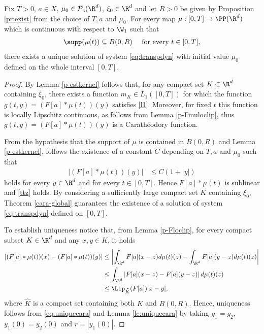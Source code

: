\begin{proposition}
Fix $T > 0$, $a \in X$, $\mu_0 \in \mathcal{P}_c(\R^d)$, $\xi_0 \in \R^d$ and let $R > 0$ be given by Proposition \ref{pr:exist} from the choice of $T, a$ and $\mu_0$. For every map $\mu:[0,T] \rightarrow \PP(\R^d)$ which is continuous with respect to $\W_1$ such that
\begin{align*}
\supp(\mu(t)) \subseteq B(0,R) \quad \text{ for every } t \in [0,T],
\end{align*}
there exists a unique solution of system \eqref{eq:transpdyn} with initial value $\mu_0$ defined on the whole interval $[0,T]$.
\end{proposition}
\begin{proof}
By Lemma \ref{p-estkernel} follows that, for any compact set $K \subset \R^d$ containing $\xi_0$, there exists a function $m_K \in L_1([0,T])$ for which the function $g(t,y)=(F[a]\ast\mu(t))(y)$ satisfies \eqref{l1}. Moreover, for fixed $t$ this function is locally Lipschitz continuous, as follows from Lemma \ref{p-Fmuloclip}, thus $g(t,y)=(F[a]\ast\mu(t))(y)$ is a Carath\'eodory function.

		
From the hypothesis that the support of $\mu$ is contained in $B(0,R)$ and Lemma \ref{p-estkernel}, follows the existence of a constant $C$ depending on $T,a$ and $\mu_0$ such that
\begin{align*}
|(F[a]*\mu(t))(y)| &\leq C(1+|y|)
\end{align*}
holds for every $y \in \R^d$ and for every $t \in [0,T]$. Hence $F[a]*\mu(t)$ is sublinear and \eqref{ttz} holds. By considering a sufficiently large compact set $K$ containing $\xi_0$, Theorem \ref{cara-global} guarantees the existence of a solution of system \eqref{eq:transpdyn} defined on $[0,T]$.

To establish uniqueness notice that, from Lemma \ref{p-Floclip}, for every compact subset $K \in \R^d$ and any $x,y \in K$, it holds
\begin{align}
\begin{split}\label{eq:uniquecara}
|(F[a]*\mu(t))(x) - (F[a]*\mu(t))(y)| &\leq \left| \int_{\R^d}F[a](x-z)d\mu(t)(z) - \int_{\R^d}F[a](y-z)d\mu(t)(z)\right| \\
&\leq \int_{\R^d} \left|F[a](x-z) - F[a](y-z)\right|d\mu(t)(z) \\
&\leq \Lip_{\widehat{K}}(F[a]) |x-y|,
\end{split}\end{align}
where $\widehat{K}$ is a compact set containing both $K$ and $B(0,R)$. Hence, uniqueness follows from \eqref{eq:uniquecara} and Lemma \ref{le:uniquecara} by taking $g_1 = g_2$, $y_1(0) = y_2(0)$ and $r = |y_1(0)|$.
\end{proof}

